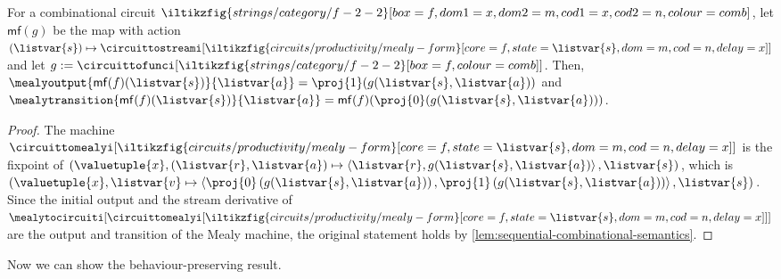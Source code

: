 \begin{proposition}
    \label{prop:mealy-form-image}
    For a combinational circuit \(
    \iltikzfig{strings/category/f-2-2}[box=f,dom1=x,dom2=m,cod1=x,cod2=n,colour=comb]
    \), let \(\mathsf{mf}(g)\) be the map with action \(
    (\listvar{s}) \mapsto
    \circuittostreami[
        \iltikzfig{circuits/productivity/mealy-form}[core=f,state=\listvar{s},dom=m,cod=n,delay=x]
    ]
    \) and let \(
    g
    :=
    \circuittofunci[
        \iltikzfig{strings/category/f-2-2}[box=f,colour=comb]
    ]
    \).
    Then, \(
    \mealyoutput{\mathsf{mf}(f)(\listvar{s})}{\listvar{a}}
    =
    \proj{1}(g(\listvar{s}, \listvar{a}))
    \) and \(
    \mealytransition{\mathsf{mf}(f)(\listvar{s})}{\listvar{a}}
    =
    \mathsf{mf}(f)(\proj{0}(g(\listvar{s}, \listvar{a})))
    \).
\end{proposition}
\begin{proof}
    The machine \(\circuittomealyi[
        \iltikzfig{circuits/productivity/mealy-form}[core=f,state=\listvar{s},dom=m,cod=n,delay=x]
    ]\) is the fixpoint of \(
    \left(\valuetuple{x},
    (\listvar{r}, \listvar{a}) \mapsto \left\langle
    \listvar{r}, g(\listvar{s}, \listvar{a})
    \right\rangle, \listvar{s}\right)
    \), which is \(
    \left(\valuetuple{x},
    \listvar{v} \mapsto \left\langle
    \proj{0}\left(g(\listvar{s},\listvar{a})\right),
    \proj{1}\left(g(\listvar{s}, \listvar{a})\right)
    \right\rangle, \listvar{s}\right)
    \).
    Since the initial output and the stream derivative of \(
    \mealytocircuiti[
        \circuittomealyi[
            \iltikzfig{circuits/productivity/mealy-form}[core=f,state=\listvar{s},dom=m,cod=n,delay=x]
        ]
    ]
    \) are the output and transition of the Mealy machine, the original
    statement holds by \cref{lem:sequential-combinational-semantics}.
\end{proof}

Now we can show the behaviour-preserving result.

